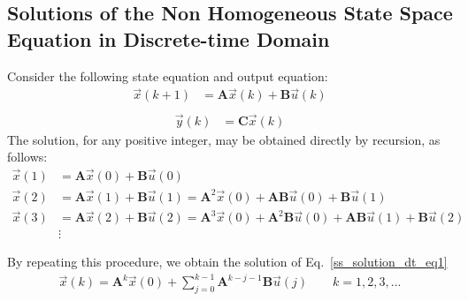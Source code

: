 \documentclass[12pt,a4paper,oneside]{book}
\begin{document}
\begin{onehalfspace}
\subsection{Solutions of the Non Homogeneous State Space Equation in 
	Discrete-time Domain}
Consider the following state equation and output equation:
\begin{equation}\label{ss_solution_dt_eq1}
\begin{aligned}
		\vec{x}(k+1) &= \mathbf{A}\vec{x}(k) + \mathbf{B}\vec{u}(k) \\[6pt]
	\end{aligned}
\end{equation}
\begin{equation}\label{ss_solution_dt_eq1b}
\begin{aligned}
		\vec{y}(k) &= \mathbf{C}\vec{x}(k)
	\end{aligned}
\end{equation}
The solution, for any positive integer, may be obtained directly by recursion, 
as follows:
\begin{equation}\label{ss_solution_dt_eq2}
	\begin{aligned}
		\vec{x}(1) &= \mathbf{A}\vec{x}(0) + \mathbf{B}\vec{u}(0)\\[6pt]
		\vec{x}(2) &= \mathbf{A}\vec{x}(1) + \mathbf{B}\vec{u}(1) = 
		\mathbf{A}^2\vec{x}(0) + 
		\mathbf{A}\mathbf{B}\vec{u}(0)+\mathbf{B}\vec{u}(1)\\[6pt]
		\vec{x}(3) &= \mathbf{A}\vec{x}(2) + \mathbf{B}\vec{u}(2) = 
		\mathbf{A}^3\vec{x}(0) + 
		\mathbf{A}^2\mathbf{B}\vec{u}(0)+\mathbf{A}\mathbf{B}\vec{u}(1)+\mathbf{B}\vec{u}(2)\\[6pt]
		&\vdots
	\end{aligned}
\end{equation}
\begin{mybox}
	By repeating this procedure, we obtain the solution of 
	Eq.~\eqref{ss_solution_dt_eq1}
	\begin{equation}\label{ss_solution_dt_eq3}
		\begin{aligned}
			\vec{x}(k) = \mathbf{A}^k\vec{x}(0) + 
			\sum_{j=0}^{k-1}\mathbf{A}^{k-j-1}\mathbf{B}\vec{u}(j) \quad \quad 
			k=1,2,3,...
		\end{aligned}
	\end{equation}
\end{mybox}


\end{onehalfspace}
\end{document}
